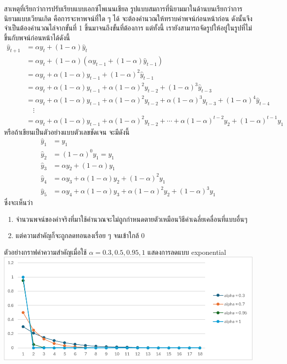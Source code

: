 \newpage
\begin{remark}
    {สาเหตุที่เรียกว่าการปรับเรียบแบบเอกซ์โพเนนเชียล}{}
    รูปแบบสมการที่นิยามมาในด้านบนเรียกว่าการนิยามแบบเวียนเกิด คือการจะหาพจน์ที่ใด ๆ ได้ จะต้องคำนวณให้ทราบค่าพจน์ก่อนหน้าก่อน ดังนั้นจึงจำเป็นต้องคำนวณไล่จากขั้นที่ 1 ขึ้นมาจนถึงขั้นที่ต้องการ แต่ทั้งนี้ เรายังสามารถจัดรูปให้อยู่ในรูปที่ไม่ขึ้นกับพจน์ก่อนหน้าได้ดังนี้
    \begin{align*}
        \hat{y}_{t+1}   &= \alpha y_{t} + (1-\alpha)\hat{y}_t\\
                        &= \alpha y_{t} + (1-\alpha)(\alpha y_{t-1} + (1-\alpha)\hat{y}_{t-1})\\
                        &= \alpha y_{t} + \alpha (1-\alpha) y_{t-1} + (1-\alpha)^2 \hat{y}_{t-1}\\
                        &= \alpha y_{t} + \alpha (1-\alpha) y_{t-1} + \alpha (1-\alpha)^2 y_{t-2} + (1-\alpha)^3 \hat{y}_{t-3}\\
                        &= \alpha y_{t} + \alpha (1-\alpha) y_{t-1} + \alpha (1-\alpha)^2 y_{t-2} + \alpha (1-\alpha)^3 y_{t-3} + (1-\alpha)^4 \hat{y}_{t-4}\\
                        & \quad\vdots \\
                        &= \alpha y_{t} + \alpha (1-\alpha) y_{t-1} + \alpha (1-\alpha)^2 y_{t-2} + \cdots + \alpha (1-\alpha)^{t-2} y_2 + (1 - \alpha)^{t-1} y_1
    \end{align*}
    หรือถ้าเขียนเป็นตัวอย่างแบบตัวเลขชัดเจน จะมีดังนี้
    \begin{align*}
        \hat{y}_1 &= y_1\\
        \hat{y}_2 &= (1 - \alpha)^0 y_1 = y_1\\
        \hat{y}_3 &= \alpha y_2 + (1-\alpha) y_1\\
        \hat{y}_4 &= \alpha y_3 + \alpha (1-\alpha) y_2 + (1-\alpha)^2 y_1\\
        \hat{y}_5 &= \alpha y_4 + \alpha (1-\alpha) y_3 + \alpha (1-\alpha)^2 y_2 + (1-\alpha)^3 y_1
    \end{align*}
    ซึ่งจะเห็นว่า
    \begin{enumerate}
        \item จำนวนพจน์ของค่าจริงที่มาใช้คำนวณจะไม่ถูกกำหนดตายตัวเหมือนวิธีค่าเฉลี่ยเคลื่อนที่แบบอื่นๆ
        \item แต่ความสำคัญก็จะถูกลดทอนลงเรื่อย ๆ จนเข้าใกล้ 0
    \end{enumerate}
    ตัวอย่างกราฟค่าความสำคัญเมื่อใช้ $\alpha = 0.3, 0.5, 0.95, 1$ แสดงการลดแบบ exponential\\
    \includegraphics[width=0.9\linewidth]{alpha-expo-smoothing.png}
\end{remark}

